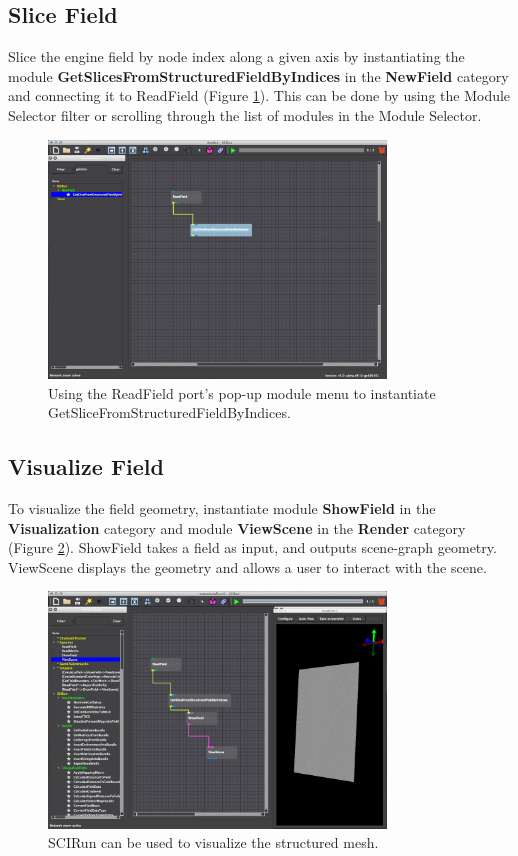 \documentclass[fleqn,11pt,openany]{book}
\begin{document}
\subsection{Slice Field}\label{slice}

Slice the engine field by node index along a given axis by instantiating the module
\textbf{GetSlicesFromStructuredFieldByIndices} in the \textbf{NewField} category and connecting it to ReadField (Figure \ref{fig:slicemod}). This can be done by using the Module Selector filter or scrolling through the list of modules in the Module Selector.

\begin{figure}[H]
\center
\includegraphics[width=0.8\textwidth]{BasicTutorial_figures/getslice.png}
\caption{Using the ReadField port's pop-up module menu to instantiate GetSliceFromStructuredFieldByIndices.}
\label{fig:slicemod}
\end{figure}

\subsection{Visualize Field}\label{visualize}

To visualize the field geometry, instantiate module \textbf{ShowField}
in the \textbf{Visualization} category and module \textbf{ViewScene}
in the \textbf{Render} category (Figure \ref{fig:colormap}).
ShowField takes a field as input, and outputs scene-graph geometry.
ViewScene displays the geometry and allows a user to interact with the scene.

\begin{figure}[H]
\center
\includegraphics[width=0.8\textwidth]{BasicTutorial_figures/viewscene.png}
\caption{SCIRun can be used to visualize the structured mesh.}
\label{fig:colormap}
\end{figure}
\end{document}
